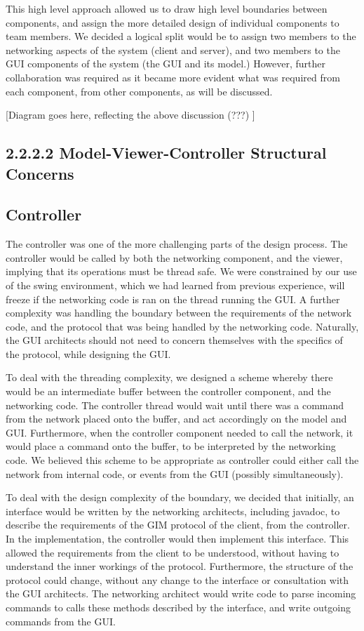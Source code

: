 This high level approach allowed us to draw high level boundaries between components, and assign the more detailed design of individual components to team members. We decided a logical split would be to assign two members to the networking aspects of the system (client and server), and two members to the GUI components of the system (the GUI and its model.) However, further collaboration was required as it became more evident what was required from each component, from other components, as will be discussed. 

[Diagram goes here, reflecting the above discussion (???) ]

\subsection {2.2.2.2 Model-Viewer-Controller Structural Concerns}

\subsection {Controller}

The controller was one of the more challenging parts of the design process. The controller would be called by both the networking component, and the viewer, implying that its operations must be thread safe. We were constrained by our use of the swing environment, which we had learned from previous experience, will freeze if the networking code is ran on the thread running the GUI. A further complexity was handling the boundary between the requirements of the network code, and the protocol that was being handled by the networking code. Naturally, the GUI architects should not need to concern themselves with the specifics of the protocol, while designing the GUI. 

To deal with the threading complexity, we designed a scheme whereby there would be an intermediate buffer between the controller component, and the networking code. The controller thread would wait until there was a command from the network placed onto the buffer, and act accordingly on the model and GUI. Furthermore, when the controller component needed to call the network, it would place a command onto the buffer, to be interpreted by the  networking code. We believed this scheme to be appropriate as controller could either call the network from internal code, or events from the GUI (possibly simultaneously).

To deal with the design complexity of the boundary, we decided that initially, an interface would be written by the networking architects, including javadoc, to describe the requirements of the GIM protocol of the client, from the controller. In the implementation, the controller would then implement this interface. This allowed the requirements from the client to be understood, without having to understand the inner workings of the protocol. Furthermore, the structure of the protocol could change, without any change to the interface or consultation with the GUI architects. The networking architect would write code to parse incoming commands to calls these methods described by the interface, and write outgoing commands from the GUI.

